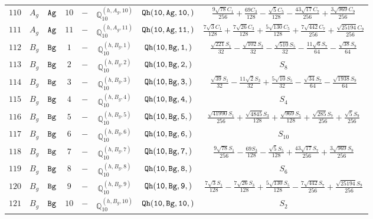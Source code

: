 \documentclass[fleqn,8pt]{jsarticle}
\begin{document}
\begin{table}[ht!]
\begin{center}
\begin{tabular}{cccccccc}
$ 110 $ & $ A_{g} $ & $ {\tt Ag} $ & $ 10 $ & $ - $ & $ \mathbb{Q}_{10}^{(h,A_{g},10)} $ & $ {\tt Qh(10,Ag,10,)} $ & $ \frac{9 \sqrt{78} C_{1}}{256} + \frac{69 C_{3}}{128} - \frac{\sqrt{5} C_{5}}{128} - \frac{43 \sqrt{17} C_{7}}{256} + \frac{3 \sqrt{969} C_{9}}{256} $ \\
$ 111 $ & $ A_{g} $ & $ {\tt Ag} $ & $ 11 $ & $ - $ & $ \mathbb{Q}_{10}^{(h,A_{g},11)} $ & $ {\tt Qh(10,Ag,11,)} $ & $ \frac{7 \sqrt{3} C_{1}}{128} + \frac{7 \sqrt{26} C_{3}}{128} + \frac{5 \sqrt{130} C_{5}}{128} + \frac{7 \sqrt{442} C_{7}}{256} + \frac{\sqrt{25194} C_{9}}{256} $ \\
$ 112 $ & $ B_{g} $ & $ {\tt Bg} $ & $ 1 $ & $ - $ & $ \mathbb{Q}_{10}^{(h,B_{g},1)} $ & $ {\tt Qh(10,Bg,1,)} $ & $ \frac{\sqrt{221} S_{1}}{32} - \frac{\sqrt{102} S_{3}}{32} - \frac{\sqrt{510} S_{5}}{32} - \frac{11 \sqrt{6} S_{7}}{64} - \frac{\sqrt{38} S_{9}}{64} $ \\
$ 113 $ & $ B_{g} $ & $ {\tt Bg} $ & $ 2 $ & $ - $ & $ \mathbb{Q}_{10}^{(h,B_{g},2)} $ & $ {\tt Qh(10,Bg,2,)} $ & $ S_{8} $ \\
$ 114 $ & $ B_{g} $ & $ {\tt Bg} $ & $ 3 $ & $ - $ & $ \mathbb{Q}_{10}^{(h,B_{g},3)} $ & $ {\tt Qh(10,Bg,3,)} $ & $ \frac{\sqrt{39} S_{1}}{32} - \frac{11 \sqrt{2} S_{3}}{32} + \frac{5 \sqrt{10} S_{5}}{32} - \frac{\sqrt{34} S_{7}}{64} - \frac{\sqrt{1938} S_{9}}{64} $ \\
$ 115 $ & $ B_{g} $ & $ {\tt Bg} $ & $ 4 $ & $ - $ & $ \mathbb{Q}_{10}^{(h,B_{g},4)} $ & $ {\tt Qh(10,Bg,4,)} $ & $ S_{4} $ \\
$ 116 $ & $ B_{g} $ & $ {\tt Bg} $ & $ 5 $ & $ - $ & $ \mathbb{Q}_{10}^{(h,B_{g},5)} $ & $ {\tt Qh(10,Bg,5,)} $ & $ \frac{\sqrt{41990} S_{1}}{256} + \frac{\sqrt{4845} S_{3}}{128} + \frac{\sqrt{969} S_{5}}{128} + \frac{\sqrt{285} S_{7}}{256} + \frac{\sqrt{5} S_{9}}{256} $ \\
$ 117 $ & $ B_{g} $ & $ {\tt Bg} $ & $ 6 $ & $ - $ & $ \mathbb{Q}_{10}^{(h,B_{g},6)} $ & $ {\tt Qh(10,Bg,6,)} $ & $ S_{10} $ \\
$ 118 $ & $ B_{g} $ & $ {\tt Bg} $ & $ 7 $ & $ - $ & $ \mathbb{Q}_{10}^{(h,B_{g},7)} $ & $ {\tt Qh(10,Bg,7,)} $ & $ \frac{9 \sqrt{78} S_{1}}{256} - \frac{69 S_{3}}{128} - \frac{\sqrt{5} S_{5}}{128} + \frac{43 \sqrt{17} S_{7}}{256} + \frac{3 \sqrt{969} S_{9}}{256} $ \\
$ 119 $ & $ B_{g} $ & $ {\tt Bg} $ & $ 8 $ & $ - $ & $ \mathbb{Q}_{10}^{(h,B_{g},8)} $ & $ {\tt Qh(10,Bg,8,)} $ & $ S_{6} $ \\
$ 120 $ & $ B_{g} $ & $ {\tt Bg} $ & $ 9 $ & $ - $ & $ \mathbb{Q}_{10}^{(h,B_{g},9)} $ & $ {\tt Qh(10,Bg,9,)} $ & $ \frac{7 \sqrt{3} S_{1}}{128} - \frac{7 \sqrt{26} S_{3}}{128} + \frac{5 \sqrt{130} S_{5}}{128} - \frac{7 \sqrt{442} S_{7}}{256} + \frac{\sqrt{25194} S_{9}}{256} $ \\
$ 121 $ & $ B_{g} $ & $ {\tt Bg} $ & $ 10 $ & $ - $ & $ \mathbb{Q}_{10}^{(h,B_{g},10)} $ & $ {\tt Qh(10,Bg,10,)} $ & $ S_{2} $ \\
 \hline \hline
\end{tabular}
\end{center}
\end{table}
\end{document}
